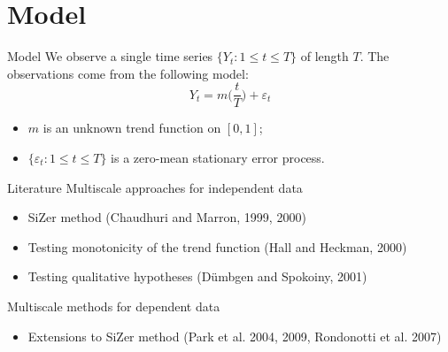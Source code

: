 \documentclass[10pt]{beamer}
\begin{document}
%	

\section{Model}
\begin{frame}{Model}
We observe a single time series $\{Y_t: 1 \le t \le T \}$ of length $T$. The observations come from the following model:
\begin{equation*}\label{model1}
Y_t = m \Big( \frac{t}{T} \Big) + \varepsilon_t 
\end{equation*}
\vspace{-6mm}
\begin{itemize}
\item $m$ is an unknown trend function on $[0,1]$;
\item $\{ \varepsilon_t: 1 \le t \le T \}$ is a zero-mean stationary error process.
\end{itemize}
\end{frame}

\begin{frame}{Literature}
	Multiscale approaches for independent data
	\begin{itemize}
		\item SiZer method (Chaudhuri and Marron, 1999, 2000)
		\item Testing monotonicity of the trend function (Hall and Heckman, 2000)
		\item Testing qualitative hypotheses (D{\"u}mbgen and Spokoiny, 2001)
	\end{itemize}\pause
	Multiscale methods for dependent data
	\begin{itemize}
		\item Extensions to SiZer method (Park et al. 2004, 2009, Rondonotti et al. 2007)
	\end{itemize}
\end{frame}
\end{document}

